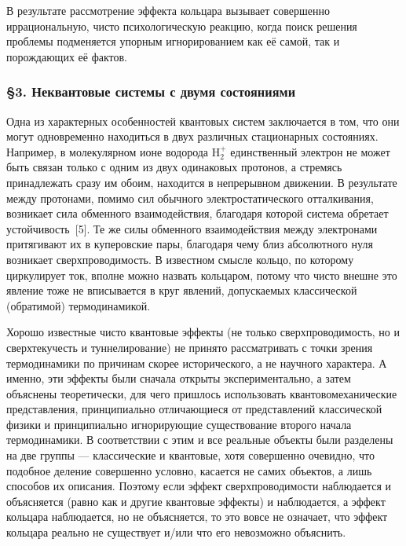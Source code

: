 \documentclass[12pt,a4paper]{article}
\begin{document}
В результате рассмотрение эффекта кольцара вызывает совершенно иррациональную,
чисто психологическую реакцию, когда поиск решения проблемы подменяется
упорным игнорированием как её самой, так и порождающих её фактов.

\subsubsection*{§3. Неквантовые системы с двумя состояниями}

Одна из характерных особенностей квантовых систем заключается в том, что они
могут одновременно находиться в двух различных стационарных состояниях.
Например, в молекулярном ионе водорода $\text{H}_2^+$ единственный электрон не
может быть связан только с одним из двух одинаковых протонов, а стремясь
принадлежать сразу им обоим, находится в непрерывном движении. В результате
между протонами, помимо сил обычного электростатического отталкивания,
возникает сила обменного взаимодействия, благодаря которой система обретает
устойчивость~[5]. Те же силы обменного взаимодействия между электронами
притягивают их в куперовские пары, благодаря чему близ абсолютного нуля
возникает сверхпроводимость. В известном смысле кольцо, по которому циркулирует
ток, вполне можно назвать кольцаром, потому что чисто внешне это явление тоже
не вписывается в круг явлений, допускаемых классической (обратимой)
термодинамикой.

Хорошо известные чисто квантовые эффекты (не только сверхпроводимость, но и
сверхтекучесть и туннелирование) не принято рассматривать с точки зрения
термодинамики по причинам скорее исторического, а не научного характера. А
именно, эти эффекты были сначала открыты экспериментально, а затем объяснены
теоретически, для чего пришлось использовать квантовомеханические представления,
принципиально отличающиеся от представлений классической физики и
принципиально игнорирующие существование второго начала термодинамики. В
соответствии с этим и все реальные объекты были разделены на две группы —
классические и квантовые, хотя совершенно очевидно, что подобное деление
совершенно условно, касается не самих объектов, а лишь способов их описания.
Поэтому если эффект сверхпроводимости наблюдается и объясняется (равно как и
другие квантовые эффекты) и наблюдается, а эффект кольцара наблюдается, но не
объясняется, то это вовсе не означает, что эффект кольцара реально не
существует и/или что его невозможно объяснить.
\end{document}

